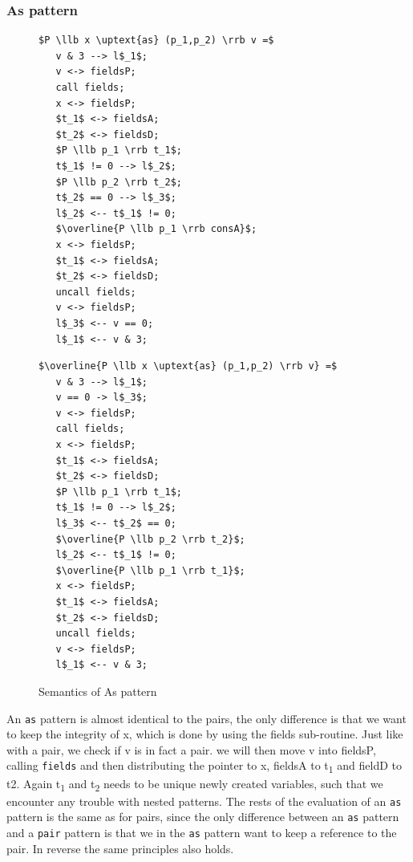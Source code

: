 \documentclass[a4paper]{article}
\begin{document}
\subsubsection{As pattern}
\label{sec:orge57bbfe}
\begin{figure}[!htb]
\begin{minipage}{0.4\textwidth}
\begin{lstlisting}
$P \llb x \uptext{as} (p_1,p_2) \rrb v =$
   v & 3 --> l$_1$;
   v <-> fieldsP;
   call fields;
   x <-> fieldsP;
   $t_1$ <-> fieldsA;
   $t_2$ <-> fieldsD;
   $P \llb p_1 \rrb t_1$;
   t$_1$ != 0 --> l$_2$;
   $P \llb p_2 \rrb t_2$;
   t$_2$ == 0 --> l$_3$;
   l$_2$ <-- t$_1$ != 0;
   $\overline{P \llb p_1 \rrb consA}$;
   x <-> fieldsP;
   $t_1$ <-> fieldsA;
   $t_2$ <-> fieldsD;
   uncall fields;
   v <-> fieldsP;
   l$_3$ <-- v == 0;
   l$_1$ <-- v & 3;
\end{lstlisting}
\end{minipage}
\qquad
\begin{minipage}{0.4\textwidth}
\begin{lstlisting}
$\overline{P \llb x \uptext{as} (p_1,p_2) \rrb v} =$
   v & 3 --> l$_1$;
   v == 0 -> l$_3$;
   v <-> fieldsP;
   call fields;
   x <-> fieldsP;
   $t_1$ <-> fieldsA;
   $t_2$ <-> fieldsD;
   $P \llb p_1 \rrb t_1$;
   t$_1$ != 0 --> l$_2$;
   l$_3$ <-- t$_2$ == 0;
   $\overline{P \llb p_2 \rrb t_2}$;
   l$_2$ <-- t$_1$ != 0;
   $\overline{P \llb p_1 \rrb t_1}$;
   x <-> fieldsP;
   $t_1$ <-> fieldsA;
   $t_2$ <-> fieldsD;
   uncall fields;
   v <-> fieldsP;
   l$_1$ <-- v & 3;
\end{lstlisting}
\end{minipage}

\caption{Semantics of As pattern}
\label{As}
\end{figure}
An \texttt{as} pattern is almost identical to the pairs, the only difference is that we want to keep the integrity of x, which is done by using the fields sub-routine. Just like with a pair, we check if v is in fact a pair. we will then move v into fieldsP, calling \texttt{fields} and then distributing the pointer to x, fieldsA to t\textsubscript{1} and fieldD to t2. Again t\textsubscript{1} and t\textsubscript{2} needs to be unique newly created variables, such that we encounter any trouble with nested patterns. The rests of the evaluation of an \texttt{as} pattern is the same as for pairs, since the only difference between an \texttt{as} pattern and a \texttt{pair} pattern is that we in the \texttt{as} pattern want to keep a reference to the pair.  In reverse the same principles also holds.
\end{document}
